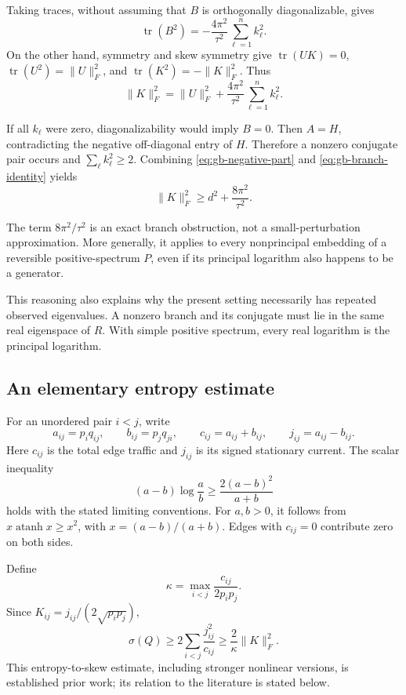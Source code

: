 Taking traces, without assuming that $B$ is orthogonally diagonalizable,
gives
\[
 \operatorname{tr}(B^2)
 =-\frac{4\pi^2}{\tau^2}\sum_{\ell=1}^n k_\ell^2.
\]
On the other hand, symmetry and skew symmetry give
$\operatorname{tr}(UK)=0$,
$\operatorname{tr}(U^2)=\|U\|_F^2$, and
$\operatorname{tr}(K^2)=-\|K\|_F^2$. Thus
\begin{equation}
 \boxed{\displaystyle
 \|K\|_F^2=\|U\|_F^2+
 \frac{4\pi^2}{\tau^2}\sum_{\ell=1}^n k_\ell^2.
 }
 \label{eq:gb-branch-identity}
\end{equation}

If all $k_\ell$ were zero, diagonalizability would imply $B=0$.
Then $A=H$, contradicting the negative off-diagonal entry of $H$.
Therefore a nonzero conjugate pair occurs and
$\sum_\ell k_\ell^2\geq2$. Combining
\eqref{eq:gb-negative-part} and \eqref{eq:gb-branch-identity} yields
\begin{equation}
 \|K\|_F^2\geq d^2+\frac{8\pi^2}{\tau^2}.
 \label{eq:gb-skew-floor}
\end{equation}

The term $8\pi^2/\tau^2$ is an exact branch obstruction, not a
small-perturbation approximation. More generally, it applies to every
nonprincipal embedding of a reversible positive-spectrum $P$, even if
its principal logarithm also happens to be a generator.

This reasoning also explains why the present setting necessarily has
repeated observed eigenvalues. A nonzero branch and its conjugate
must lie in the same real eigenspace of $R$. With simple positive
spectrum, every real logarithm is the principal logarithm.

\subsection{An elementary entropy estimate}

For an unordered pair $i<j$, write
\[
 a_{ij}=p_iq_{ij},\qquad b_{ij}=p_jq_{ji},\qquad
 c_{ij}=a_{ij}+b_{ij},\qquad j_{ij}=a_{ij}-b_{ij}.
\]
Here $c_{ij}$ is the total edge traffic and $j_{ij}$ is its signed
stationary current. The scalar inequality
\begin{equation}
 (a-b)\log\frac ab\geq\frac{2(a-b)^2}{a+b}
 \label{eq:gb-scalar}
\end{equation}
holds with the stated limiting conventions. For $a,b>0$, it follows
from $x\operatorname{atanh}x\geq x^2$, with
$x=(a-b)/(a+b)$. Edges with $c_{ij}=0$ contribute zero on both sides.

Define
\[
 \kappa=\max_{i<j}\frac{c_{ij}}{2p_ip_j}.
\]
Since $K_{ij}=j_{ij}/(2\sqrt{p_ip_j})$,
\begin{equation}
 \sigma(Q)\geq2\sum_{i<j}\frac{j_{ij}^2}{c_{ij}}
 \geq\frac{2}{\kappa}\|K\|_F^2.
 \label{eq:gb-kappa-bound}
\end{equation}
This entropy-to-skew estimate, including stronger nonlinear versions,
is established prior work; its relation to the literature is stated
below.

